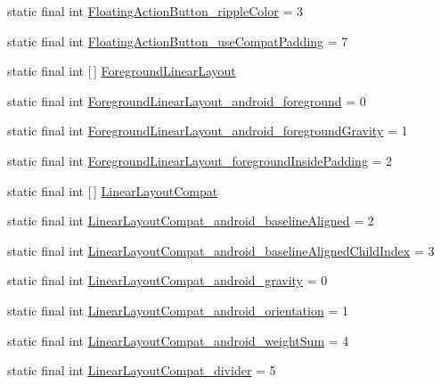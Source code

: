 \begin{DoxyCompactItemize}
static final int \hyperlink{classproject4_1_1xaria_1_1R_1_1styleable_a74c9af162dc277de265d5a2e6fbcbe9e}{Floating\+Action\+Button\+\_\+ripple\+Color} = 3
\item 
static final int \hyperlink{classproject4_1_1xaria_1_1R_1_1styleable_a234a6a0e94e66106e7873eb4647e1fcb}{Floating\+Action\+Button\+\_\+use\+Compat\+Padding} = 7
\item 
static final int \mbox{[}$\,$\mbox{]} \hyperlink{classproject4_1_1xaria_1_1R_1_1styleable_a32963533d4ea1b671544e3c531ad5f97}{Foreground\+Linear\+Layout}
\item 
static final int \hyperlink{classproject4_1_1xaria_1_1R_1_1styleable_a29b782c0f85c8604b2500abe6388cf6d}{Foreground\+Linear\+Layout\+\_\+android\+\_\+foreground} = 0
\item 
static final int \hyperlink{classproject4_1_1xaria_1_1R_1_1styleable_acf255ff36098cb0688c9afd1841453dd}{Foreground\+Linear\+Layout\+\_\+android\+\_\+foreground\+Gravity} = 1
\item 
static final int \hyperlink{classproject4_1_1xaria_1_1R_1_1styleable_a396d6deee9a0dba4405845d2d80299bf}{Foreground\+Linear\+Layout\+\_\+foreground\+Inside\+Padding} = 2
\item 
static final int \mbox{[}$\,$\mbox{]} \hyperlink{classproject4_1_1xaria_1_1R_1_1styleable_a7f929bdf7d740d51fa83ce463e56c432}{Linear\+Layout\+Compat}
\item 
static final int \hyperlink{classproject4_1_1xaria_1_1R_1_1styleable_a9be6e1f075c0511bc62f02db852f77d5}{Linear\+Layout\+Compat\+\_\+android\+\_\+baseline\+Aligned} = 2
\item 
static final int \hyperlink{classproject4_1_1xaria_1_1R_1_1styleable_ab84764f190efeef60cefb6eba9332ba5}{Linear\+Layout\+Compat\+\_\+android\+\_\+baseline\+Aligned\+Child\+Index} = 3
\item 
static final int \hyperlink{classproject4_1_1xaria_1_1R_1_1styleable_a2a3b513c0f7f71ed6b75218dd32d011e}{Linear\+Layout\+Compat\+\_\+android\+\_\+gravity} = 0
\item 
static final int \hyperlink{classproject4_1_1xaria_1_1R_1_1styleable_a2cd81e7b3c982ef6daea0093965c9ea9}{Linear\+Layout\+Compat\+\_\+android\+\_\+orientation} = 1
\item 
static final int \hyperlink{classproject4_1_1xaria_1_1R_1_1styleable_a3787a7bcd5b812a12873e33ec20a496c}{Linear\+Layout\+Compat\+\_\+android\+\_\+weight\+Sum} = 4
\item 
static final int \hyperlink{classproject4_1_1xaria_1_1R_1_1styleable_a203fc5f441152f8ffcecb5604e918fa0}{Linear\+Layout\+Compat\+\_\+divider} = 5

\end{DoxyCompactItemize}
